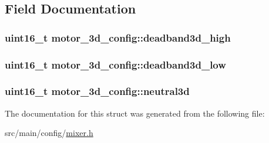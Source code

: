 \subsection{Field Documentation}
\hypertarget{structmotor__3d__config_a3b3a409292afe24809921d88f5711d3e}{
\subsubsection[{deadband3d\+\_\+high}]{\setlength{\rightskip}{0pt plus 5cm}uint16\+\_\+t motor\+\_\+3d\+\_\+config\+::deadband3d\+\_\+high}}\label{structmotor__3d__config_a3b3a409292afe24809921d88f5711d3e}
\hypertarget{structmotor__3d__config_aad1d5c14b6d3915090315f805d821659}{
\subsubsection[{deadband3d\+\_\+low}]{\setlength{\rightskip}{0pt plus 5cm}uint16\+\_\+t motor\+\_\+3d\+\_\+config\+::deadband3d\+\_\+low}}\label{structmotor__3d__config_aad1d5c14b6d3915090315f805d821659}
\hypertarget{structmotor__3d__config_a50d884c84e2a5436c81530bcaf51c937}{
\subsubsection[{neutral3d}]{\setlength{\rightskip}{0pt plus 5cm}uint16\+\_\+t motor\+\_\+3d\+\_\+config\+::neutral3d}}\label{structmotor__3d__config_a50d884c84e2a5436c81530bcaf51c937}


The documentation for this struct was generated from the following file\+:\begin{DoxyCompactItemize}
\item 
src/main/config/\hyperlink{config_2mixer_8h}{mixer.\+h}\end{DoxyCompactItemize}
